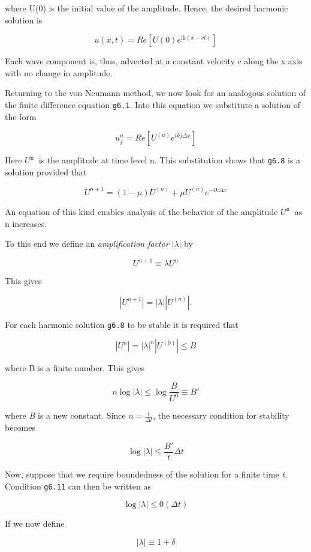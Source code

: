 where U(0) is the initial value of the amplitude. Hence, the desired
harmonic solution is

    {\[u\left( x,t \right) =Re \left\lbrack U\left( 0 \right)e^{\text{ik}\left( x - ct \right)} \right\rbrack\]}

Each wave component is, thus, advected at a constant velocity c along
the x axis with no change in amplitude.

Returning to the von Neumann method, we now look for an analogous
solution of the finite difference equation \texttt{g6.1}. Into this
equation we substitute a solution of the form

    {\[u_{j}^{n} = Re \left\lbrack U^{\left( u \right)}e^{ikj\Delta x} \right\rbrack\]}

Here \(U^{\text{n }}\) is the amplitude at time level n. This
substitution shows that \texttt{g6.8} is a solution provided that

    {\[U^{n + 1} = \left( 1 - \mu \right)U^{\left( n \right)}  + \mu U^{\left( n \right)}e^{- ik\Delta x}\]}

An equation of this kind enables analysis of the behavior of the
amplitude \(U^{\text{n }}\) as n increases.

To this end we define an \emph{amplification factor}
\(\left| \lambda \right|\) by

    {\[U^{n + 1} \equiv \lambda U^{n}\]}

This gives

\[|U^{n + 1}| = |\lambda | | U^{(n)} |.\]

For each harmonic solution \texttt{g6.8} to be stable it is required
that

\[|U^{n}| =|\lambda |^n | U^{(0)} | \leq B\]

where B is a finite number. This gives

\[n\log |\lambda | \leq \log \frac{B}{U^0} \equiv B'\]

where \emph{B\textquotesingle{}} is a new constant. Since
\(n = \frac{t}{\Delta t}\), the necessary condition for stability
becomes

    {\[\log |\lambda | \leq \frac{B'}{t} \Delta t\]}

Now, suppose that we require boundedness of the solution for a finite
time \emph{t}. Condition \texttt{g6.11} can then be written as

\[\log|\lambda| \leq 0( \Delta t )\]

If we now define

\[\left| \lambda \right| \equiv 1 + \delta\]


